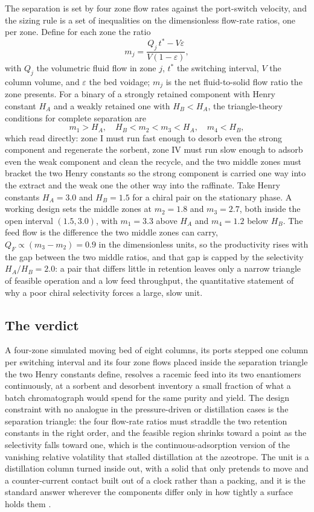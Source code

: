 The separation is set by four zone flow rates against the port-switch velocity,
and the sizing rule is a set of inequalities on the dimensionless flow-rate
ratios, one per zone. Define for each zone the ratio
\[
m_j = \frac{Q_j\,t^{*} - V\varepsilon}{V(1-\varepsilon)},
\]
with $Q_j$ the volumetric fluid flow in zone $j$, $t^{*}$ the switching
interval, $V$ the column volume, and $\varepsilon$ the bed voidage; $m_j$ is the
net fluid-to-solid flow ratio the zone presents. For a binary of a strongly
retained component with Henry constant $H_A$ and a weakly retained one with
$H_B < H_A$, the triangle-theory conditions for complete separation are
\[
m_1 > H_A,\quad H_B < m_2 < m_3 < H_A,\quad m_4 < H_B,
\]
which read directly: zone I must run fast enough to desorb even the strong
component and regenerate the sorbent, zone IV must run slow enough to adsorb
even the weak component and clean the recycle, and the two middle zones must
bracket the two Henry constants so the strong component is carried one way into
the extract and the weak one the other way into the raffinate. Take Henry
constants $H_A = 3.0$ and $H_B = 1.5$ for a chiral pair on the stationary
phase. A working design sets the middle zones at $m_2 = 1.8$ and $m_3 = 2.7$,
both inside the open interval $(1.5, 3.0)$, with $m_1 = 3.3$ above $H_A$ and
$m_4 = 1.2$ below $H_B$. The feed flow is the difference the two middle zones
can carry, $Q_F \propto (m_3 - m_2) = 0.9$ in the dimensionless units, so the
productivity rises with the gap between the two middle ratios, and that gap is
capped by the selectivity $H_A/H_B = 2.0$: a pair that differs little in
retention leaves only a narrow triangle of feasible operation and a low feed
throughput, the quantitative statement of why a poor chiral selectivity forces a
large, slow unit.

\subsection*{The verdict}

A four-zone simulated moving bed of eight columns, its ports stepped one column
per switching interval and its four zone flows placed inside the separation
triangle the two Henry constants define, resolves a racemic feed into its two
enantiomers continuously, at a sorbent and desorbent inventory a small fraction
of what a batch chromatograph would spend for the same purity and yield. The
design constraint with no analogue in the pressure-driven or distillation cases
is the separation triangle: the four flow-rate ratios must straddle the two
retention constants in the right order, and the feasible region shrinks toward a
point as the selectivity falls toward one, which is the continuous-adsorption
version of the vanishing relative volatility that stalled distillation at the
azeotrope. The unit is a distillation column turned inside out, with a solid
that only pretends to move and a counter-current contact built out of a clock
rather than a packing, and it is the standard answer wherever the components
differ only in how tightly a surface holds them
\cite{text:perry-chemical-engineers}.

